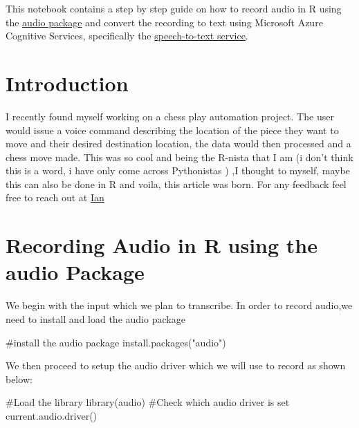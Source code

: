 \documentclass[
  letterpaper,
  DIV=11,
  numbers=noendperiod]{scrreprt}
\newenvironment{Shaded}{\begin{snugshade}}{\end{snugshade}}
\newcommand{\CommentTok}[1]{\textcolor[rgb]{0.37,0.37,0.37}{#1}}
\newcommand{\FunctionTok}[1]{\textcolor[rgb]{0.28,0.35,0.67}{#1}}
\newcommand{\NormalTok}[1]{\textcolor[rgb]{0.00,0.23,0.31}{#1}}
\newcommand{\StringTok}[1]{\textcolor[rgb]{0.13,0.47,0.30}{#1}}
\begin{document}
This notebook contains a step by step guide on how to record audio in R
using the
\href{https://cran.r-project.org/web/packages/audio/audio.pdf}{audio
package} and convert the recording to text using Microsoft Azure
Cognitive Services, specifically the
\href{https://docs.microsoft.com/en-us/azure/cognitive-services/speech-service/rest-speech-to-text-short}{speech-to-text
service}.

\hypertarget{introduction}{%
\section{Introduction}\label{introduction}}

I recently found myself working on a chess play automation project. The
user would issue a voice command describing the location of the piece
they want to move and their desired destination location, the data would
then processed and a chess move made. This was so cool and being the
R-nista that I am (i don't think this is a word, i have only come across
Pythonistas ) ,I thought to myself, maybe this can also be done in R and
voila, this article was born. For any feedback feel free to reach out at
\href{https://twitter.com/Entity_4004}{Ian}

\hypertarget{recording-audio-in-r-using-the-audio-package}{%
\section{Recording Audio in R using the audio
Package}\label{recording-audio-in-r-using-the-audio-package}}

We begin with the input which we plan to transcribe. In order to record
audio,we need to install and load the audio package

\begin{Shaded}
\begin{Highlighting}[]
\CommentTok{\#install the audio package}
\FunctionTok{install.packages}\NormalTok{(}\StringTok{"audio"}\NormalTok{)}
\end{Highlighting}
\end{Shaded}

We then proceed to setup the audio driver which we will use to record as
shown below:

\begin{Shaded}
\begin{Highlighting}[]
\CommentTok{\#Load the library}
\FunctionTok{library}\NormalTok{(audio)}
\CommentTok{\#Check which audio driver is set}
\FunctionTok{current.audio.driver}\NormalTok{()}
\end{Highlighting}
\end{Shaded}
\end{document}
